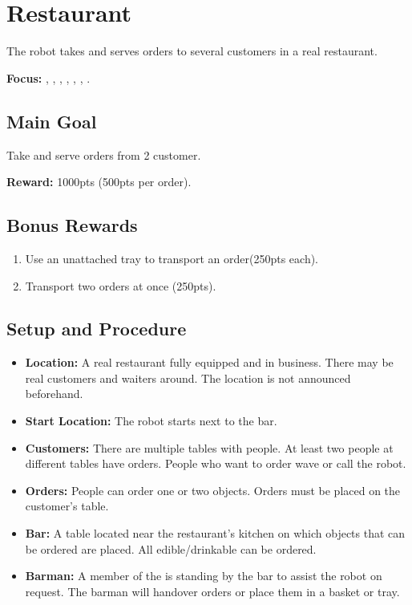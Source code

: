 \section{Restaurant}
\label{test:restaurant}
The robot takes and serves orders to several customers in a real restaurant.

\noindent \textbf{Focus:} \SysI{}, \NAV{}, \MAP{}, \HRI{}, \MAN{}, \PerDet{}, \OR{}.

\subsection*{Main Goal}
Take and serve orders from 2 customer.

\noindent\textbf{Reward:} 1000pts (500pts per order).

\subsection*{Bonus Rewards}
\begin{enumerate}[nosep]
	\item Use an unattached tray to transport an order(250pts each).
	\item Transport two orders at once (250pts).
\end{enumerate}

\subsection*{Setup and Procedure}
\begin{itemize}[nosep]
	\item \textbf{Location:} A real restaurant fully equipped and in business. There may be real customers and waiters around. The location is not announced beforehand.

	\item \textbf{Start Location:} The robot starts next to the bar.

	\item \textbf{Customers:} There are multiple tables with people. At least two people at different tables have orders. People who want to order wave or call the robot.
	
	\item \textbf{Orders:} People can order one or two objects. Orders must be placed on the customer's table.

    \item \textbf{Bar:} A table located near the restaurant's kitchen on which objects that can be ordered are placed. All edible/drinkable \KnownObjects{} can be ordered.

	\item \textbf{Barman:} A member of the  is standing by the bar to assist the robot on request. The barman will handover orders or place them in a basket or tray.
\end{itemize}

